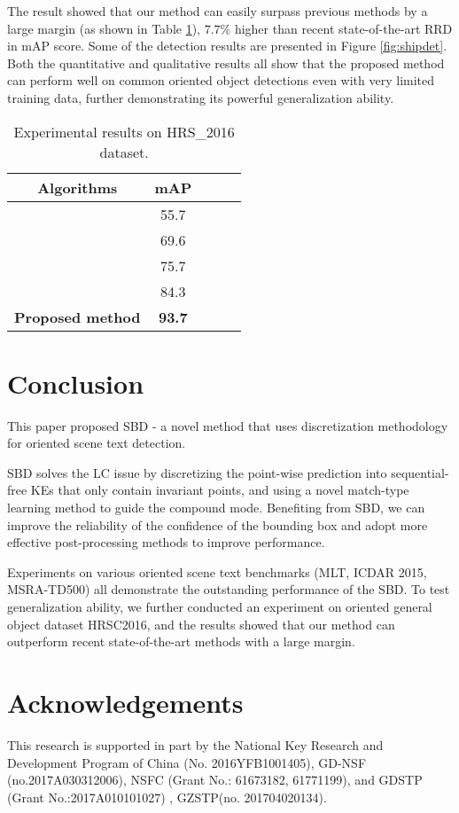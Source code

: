 \documentclass{article}
\begin{document}
The result showed that our method can easily surpass previous methods by a large margin (as shown in Table \ref{tab:hrsc}), $7.7\%$ higher than recent state-of-the-art RRD \cite{liao2018rotation} in mAP score. Some of the detection results are presented in Figure \ref{fig:shipdet}. Both the quantitative and qualitative results all show that the proposed method can perform well on common oriented object detections even with very limited training data, further demonstrating its powerful generalization ability.

\begin{table}[!t]
\centering
\small
\begin{tabular}{c|cccc}
  \hline
  Algorithms  & mAP \\
  \hline
  \cite{girshick2015fast,liao2018rotation} & 55.7\\
  \cite{girshick2015fast,liao2018rotation} & 69.6 \\
  \cite{girshick2015fast,liao2018rotation} & 75.7\\
  \cite{liao2018rotation} & 84.3 \\
  \hline
  {\bf Proposed method} &  {\bf 93.7} \\
  \hline
\end{tabular}
\caption{Experimental results on HRS\_2016 dataset. }
\label{tab:hrsc}
\end{table}


\section{Conclusion}
This paper proposed SBD - a novel method that uses discretization methodology for oriented scene text detection.

SBD solves the LC issue by discretizing the point-wise prediction into sequential-free KEs that only contain invariant points, and using a novel match-type learning method to guide the compound mode. Benefiting from SBD, we can improve the reliability of the confidence of the bounding box and adopt more effective post-processing methods to improve performance.

Experiments on various oriented scene text benchmarks (MLT, ICDAR 2015, MSRA-TD500) all demonstrate the outstanding performance of the SBD. To test generalization ability, we further conducted an experiment on oriented general object dataset HRSC2016, and the results showed that our method can outperform recent state-of-the-art methods with a large margin.

\section*{Acknowledgements}
This research is supported in part by the National Key Research and Development Program  of China (No. 2016YFB1001405), GD-NSF (no.2017A030312006),  NSFC (Grant No.: 61673182, 61771199), and GDSTP (Grant No.:2017A010101027) , GZSTP(no. 201704020134).
\end{document}

